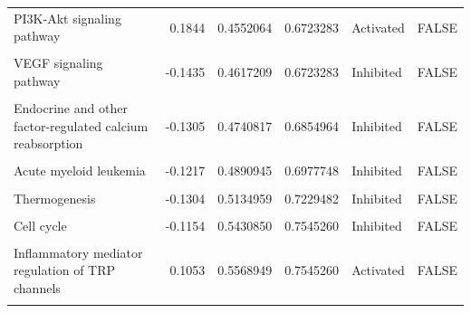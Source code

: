 \documentclass[9pt,a4paper,]{extarticle}
\begin{document}
\begin{table}
{\begin{tabular}[t]{lrrrll}
PI3K-Akt signaling pathway & 0.1844 & 0.4552064 & 0.6723283 & Activated & FALSE\\
\cellcolor{gray!6}{Hedgehog signaling pathway} & \cellcolor{gray!6}{0.1435} & \cellcolor{gray!6}{0.4610145} & \cellcolor{gray!6}{0.6723283} & \cellcolor{gray!6}{Activated} & \cellcolor{gray!6}{FALSE}\\
\addlinespace
VEGF signaling pathway & -0.1435 & 0.4617209 & 0.6723283 & Inhibited & FALSE\\
\cellcolor{gray!6}{Neutrophil extracellular trap formation} & \cellcolor{gray!6}{-0.1805} & \cellcolor{gray!6}{0.4618330} & \cellcolor{gray!6}{0.6723283} & \cellcolor{gray!6}{Inhibited} & \cellcolor{gray!6}{FALSE}\\
Endocrine and other factor-regulated calcium reabsorption & -0.1305 & 0.4740817 & 0.6854964 & Inhibited & FALSE\\
\cellcolor{gray!6}{Long-term depression} & \cellcolor{gray!6}{-0.1373} & \cellcolor{gray!6}{0.4801743} & \cellcolor{gray!6}{0.6896463} & \cellcolor{gray!6}{Inhibited} & \cellcolor{gray!6}{FALSE}\\
Acute myeloid leukemia & -0.1217 & 0.4890945 & 0.6977748 & Inhibited & FALSE\\
\addlinespace
\cellcolor{gray!6}{Pancreatic secretion} & \cellcolor{gray!6}{-0.1430} & \cellcolor{gray!6}{0.5066001} & \cellcolor{gray!6}{0.7179630} & \cellcolor{gray!6}{Inhibited} & \cellcolor{gray!6}{FALSE}\\
Thermogenesis & -0.1304 & 0.5134959 & 0.7229482 & Inhibited & FALSE\\
\cellcolor{gray!6}{Oxytocin signaling pathway} & \cellcolor{gray!6}{0.1187} & \cellcolor{gray!6}{0.5336834} & \cellcolor{gray!6}{0.7464592} & \cellcolor{gray!6}{Activated} & \cellcolor{gray!6}{FALSE}\\
Cell cycle & -0.1154 & 0.5430850 & 0.7545260 & Inhibited & FALSE\\
\cellcolor{gray!6}{Mineral absorption} & \cellcolor{gray!6}{0.1206} & \cellcolor{gray!6}{0.5476048} & \cellcolor{gray!6}{0.7545260} & \cellcolor{gray!6}{Activated} & \cellcolor{gray!6}{FALSE}\\
\addlinespace
Inflammatory mediator regulation of TRP channels & 0.1053 & 0.5568949 & 0.7545260 & Activated & FALSE\\
\cellcolor{gray!6}{Protein processing in endoplasmic reticulum} & \cellcolor{gray!6}{0.1273} & \cellcolor{gray!6}{0.5612752} & \cellcolor{gray!6}{0.7545260} & \cellcolor{gray!6}{Activated} & \cellcolor{gray!6}{FALSE}\\

\end{tabular}}
\end{table}
\end{document}
